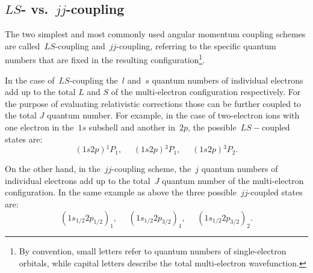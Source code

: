 \subsection{$LS$- vs.~$jj$-coupling}

The two simplest and most commonly used angular momentum coupling schemes are called~$LS$-coupling and~$jj$-coupling, referring to the specific quantum numbers that are fixed in the resulting configuration\footnote{By convention, small letters refer to quantum numbers of single-electron orbitals, while capital letters describe the total multi-electron wavefunction.}.

In the case of~$LS$-coupling the~$l$ and~$s$ quantum numbers of individual electrons add up to the total $L$ and $S$ of the multi-electron configuration respectively. For the purpose of evaluating relativistic corrections those can be further coupled to the total $J$ quantum number. For example, in the case of two-electron ions with one electron in the~$1s$ subshell and another in~$2p$, the possible~$LS-$coupled states are:
\begin{equation}
   (1s 2p) {}^1P_1,~~~~~~(1s 2p) {}^3P_1,~~~~~~(1s 2p) {}^3P_2.
\end{equation}

On the other hand, in the~$jj$-coupling scheme, the~$j$ quantum numbers of individual electrons add up to the total~$J$ quantum number of the multi-electron configuration. In the same example as above the three possible~$jj$-coupled states are:
\begin{equation}
   (1s_{1/2} 2p_{1/2})_1,~~~~~~(1s_{1/2} 2p_{3/2})_1,~~~~~~(1s_{1/2} 2p_{3/2})_2.
\end{equation}

